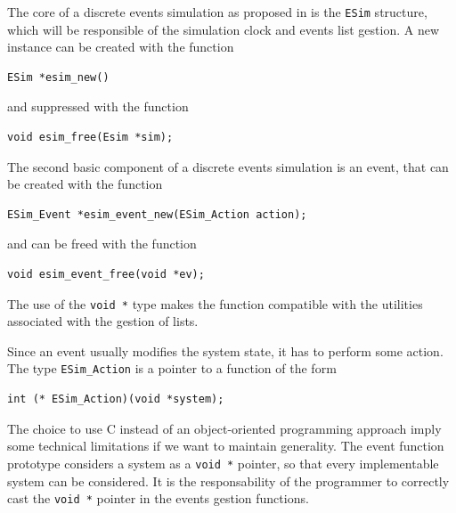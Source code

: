 The core of a discrete events simulation as proposed in \name{} is the \verb|ESim| structure,
which will be responsible of the simulation clock and events list gestion.
A new instance can be created with the function
\begin{verbatim}
ESim *esim_new()
\end{verbatim}
and suppressed with the function
\begin{verbatim}
void esim_free(Esim *sim);
\end{verbatim}

The second basic component of a discrete events simulation is an
event, that can be created with the function
\begin{verbatim}
ESim_Event *esim_event_new(ESim_Action action);
\end{verbatim}
and can be freed with the function
\begin{verbatim}
void esim_event_free(void *ev);
\end{verbatim}
The use of the \verb|void *| type makes the function compatible with
the utilities associated with the gestion of lists.

Since an event usually modifies the system state, it has to perform
some action.
The type \verb|ESim_Action| is a pointer to a function of the form
\begin{verbatim}
int (* ESim_Action)(void *system);
\end{verbatim}
The choice to use C instead of an object-oriented programming approach imply some technical limitations if we want to maintain generality.
The event function prototype considers a system as a \verb|void *| pointer, so that every implementable system can be considered.
It is the responsability of the programmer to correctly cast the \verb|void *| pointer in the events gestion functions.
